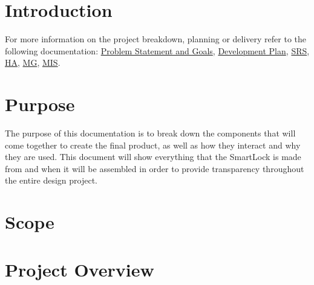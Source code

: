 \documentclass[12pt, titlepage]{article}
\begin{document}
\newpage

\listoftables

\listoffigures

\newpage


\section{Introduction}

For more information on the project breakdown, planning or delivery refer to the following documentation:
 \href{https://github.com/NevoAbigail/Capstone/blob/main/docs/ProblemStatementAndGoals/ProblemStatement.pdf}{Problem Statement and Goals},
 \href{https://github.com/NevoAbigail/Capstone/blob/main/docs/DevelopmentPlan/DevelopmentPlan.pdf}{Development Plan},
 \href{https://github.com/NevoAbigail/Capstone/blob/main/docs/SRS/SRS.pdf}{SRS},
 \href{https://github.com/NevoAbigail/Capstone/blob/main/docs/HazardAnalysis/HazardAnalysis.pdf}{HA},
 \href{https://github.com/NevoAbigail/Capstone/blob/main/docs/Design/SoftArchitecture/MG.pdf}{MG},
 \href{https://github.com/NevoAbigail/Capstone/blob/main/docs/Design/SoftDetailedDes/MIS.pdf}{MIS}.

\section{Purpose}
The purpose of this documentation is to break down the components that will come together to create the final product, as well as how they interact and why they are used. This document will show everything that the SmartLock is made from and when it will be assembled in order to provide transparency throughout the entire design project.



\section{Scope}


\section{Project Overview}
\end{document}
